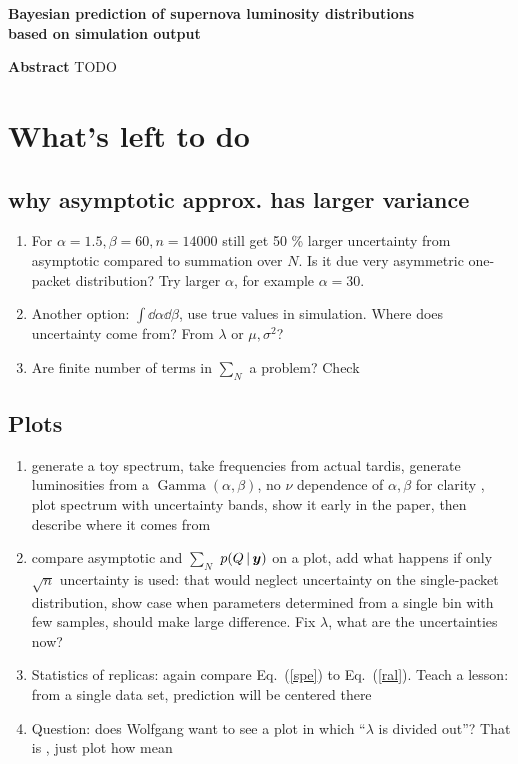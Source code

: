 \documentclass[11pt]{article}
\newcommand{\cond}{\,|\,}
\newcommand{\refeq}[1]{Eq.~(\ref{#1})}
\DeclareMathOperator{\GammaDist}{Gamma}
\newcommand{\Lumtot}{Q}
\newcommand{\rmdx}[1]{\dd{#1}} %
\begin{document}
\begin{center}
  \textbf{\Large Bayesian prediction of supernova luminosity  distributions}\\[8pt]
  \textbf{\Large based on simulation output}\\[12pt]
\end{center}

\textbf{Abstract} TODO\\

\section{What's left to do}

\subsection{why asymptotic approx. has larger variance}
\begin{enumerate}
  \item For $\alpha=1.5, \beta=60, n=14000$ still get 50 \% larger uncertainty from asymptotic compared to summation over $N$. Is it due very asymmetric one-packet distribution? Try larger $\alpha$, for example $\alpha = 30$.
  \item  Another option: $\int \rmdx{\alpha} \rmdx{\beta}$, use true values in simulation. Where does uncertainty come from? From $\lambda$ or $\mu, \sigma^2$?
  \item Are finite number of terms in $\sum_N$ a problem? Check

\end{enumerate}

\subsection{Plots}

\begin{enumerate}
  \item generate a toy spectrum, take frequencies from actual tardis,
  generate luminosities from a $\GammaDist(\alpha, \beta)$, no $\nu$
  dependence of $\alpha, \beta$ for clarity , plot spectrum with
  uncertainty bands, show it early in the paper, then describe where
  it comes from
  \item compare asymptotic and $\sum_N$ $p(\Lumtot \cond \bmy)$ on a
  plot, add what happens if only $\sqrt{n}$ uncertainty is used: that
  would neglect uncertainty on the single-packet distribution, show
  case when parameters determined from a single bin with few samples,
  should make large difference. Fix $\lambda$, what are the uncertainties now?
  \item Statistics of replicas: again compare \refeq{spe} to \refeq{ral}. Teach a lesson: from a single data set, prediction will be centered there
  \item Question: does Wolfgang want to see a plot in which ``$\lambda$ is divided out''? That is , just plot how mean
\end{enumerate}
\end{document}
